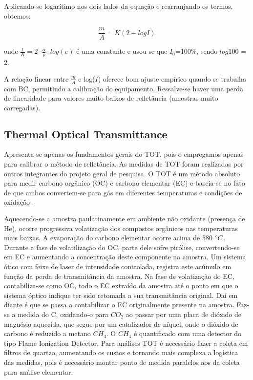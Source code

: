 Aplicando-se logarítimo nos dois lados da equação e rearranjando os termos, 
obtemos:

\begin{equation}
  \label{m/a_2}
  \frac{m}{A} = K(2-logI) 
\end{equation}

onde $\frac{1}{K} = 2 \cdot \frac{\alpha}{\rho} \cdot log(e)$
é uma constante e usou-se que $I_0$=100\%, sendo $log 100$ = 2.

A relação linear entre $\frac{m}{A}$ e log($I$) oferece bom ajuste empírico 
quando se trabalha com BC, permitindo a calibração do equipamento. 
Ressalve-se haver uma perda de linearidade para valores muito baixos de 
refletância (amostras muito carregadas).  

\subsection{Thermal Optical Transmittance}

Apresenta-se apenas os fundamentos gerais do TOT, pois o empregamos apenas para
calibrar o método de refletância. As medidas de TOT foram realizadas por outros
integrantes do projeto geral de pesquisa.
O TOT é um método absoluto para medir carbono orgânico (OC) e 
carbono elementar (EC) e baseia-se no fato de que ambos convertem-se para gás 
em diferentes temperaturas e condições de oxidação \citep{birch1998}.

Aquecendo-se a amostra paulatinamente em ambiente não oxidante (presença de He),
ocorre progressiva volatização dos compostos orgânicos nas temperaturas mais 
baixas. A evaporação do carbono elementar ocorre acima de 580 $\degree C$.
Durante a fase de volatilização do OC, parte dele sofre pirólise, 
convertendo-se em EC e aumentando a concentração deste componente na amostra. 
Um sistema ótico com feixe de laser de intensidade controlada, registra este 
acúmulo em função da perda de transmitância da amostra.
Na fase de volatização do EC, contabiliza-se como OC, todo o EC extraído da 
amostra até o ponto em que o sistema óptico indique ter sido retomada a sua 
transmitância original. Daí em diante é que se passa a contabilizar o EC 
originalmente presente na amostra.
Faz-se a medida do C, oxidando-o para $CO_2$ ao passar por uma placa de dióxido
de magnésio aquecida, que segue por um catalizador de níquel, 
onde o dióxido de carbono é reduzido a metano $CH_4$. O $CH_4$ é quantificado 
com uma detector do tipo Flame Ionization Detector.
Para análises TOT é necessário fazer a coleta em filtros de quartzo, aumentando 
os custos e tornando mais complexa a logística das medidas, 
pois é necessário montar ponto de medida paralelos aos da coleta para análise
elementar.
